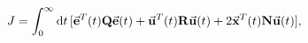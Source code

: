 \documentclass[
    crop,
    margin=0.05in,
    convert={density=150}
]{standalone}
\begin{document}
    $\displaystyle
        J = \int_0^\infty \dd{t} [\va{e}^T(t)\vb{Q}\va{e}(t) + \va{u}^T(t)\vb{R}\va{u}(t) + 2\va{x}^T(t)\vb{N}\va{u}(t)],
    $
\end{document}

